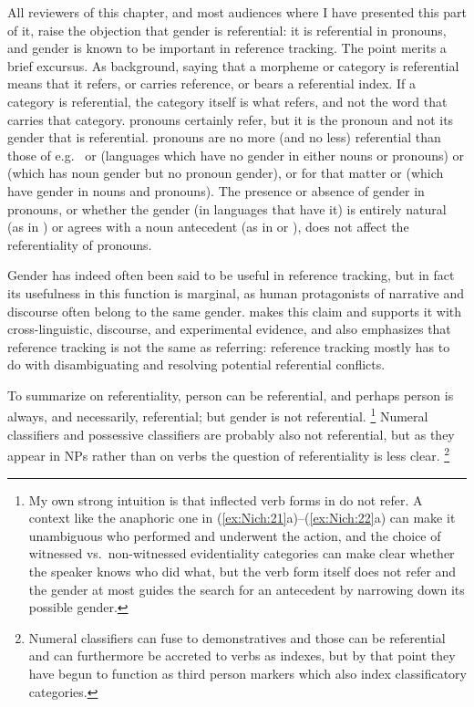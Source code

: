 \documentclass[output=collectionpaper]{langsci/langscibook}
\begin{document}
All reviewers of this chapter, and most audiences where I have presented this part of it, raise the objection that gender is referential: it is referential in  pronouns, and gender is known to be important in reference tracking. The point merits a brief excursus. As background, saying that a morpheme or category is referential means that it refers, or carries reference, or bears a referential index. If a category is referential, the category itself is what refers, and not the word that carries that category.  pronouns certainly refer, but it is the pronoun and not its gender that is referential.  pronouns are no more (and no less) referential than those of e.g.\  or  (languages which have no gender in either nouns or pronouns) or  (which has noun gender but no pronoun gender), or for that matter  or  (which have gender in nouns and pronouns). The presence or absence of gender in pronouns, or whether the gender (in languages that have it) is entirely natural (as in ) or agrees with a noun antecedent (as in  or ), does not affect the referentiality of pronouns.

Gender has indeed often been said to be useful in reference tracking, but in fact its usefulness in this function is marginal, as human protagonists of narrative and discourse often belong to the same gender. \citet[334--360]{Kibrik2011} makes this claim and supports it with cross-linguistic, discourse, and experimental evidence, and also emphasizes that reference tracking is not the same as referring: reference tracking mostly has to do with disambiguating and resolving potential referential conflicts.

To summarize on referentiality, person can be referential, and perhaps person is always, and necessarily, referential; but gender is not referential.%
\footnote{%
My own strong intuition is that inflected verb forms in  do not refer. A context like the anaphoric one in (\ref{ex:Nich:21}a)--(\ref{ex:Nich:22}a) can make it unambiguous who performed and underwent the action, and the choice of witnessed vs.\ non-witnessed evidentiality categories can make clear whether the speaker knows who did what, but the verb form itself does not refer and the gender at most guides the search for an antecedent by narrowing down its possible gender.
} %
Numeral classifiers and possessive classifiers are probably also not referential, but as they appear in NPs rather than on verbs the question of referentiality is less clear.%
\footnote{%
Numeral classifiers can fuse to demonstratives and those can be referential and can furthermore be accreted to verbs as indexes, but by that point they have begun to function as third person markers which also index classificatory categories.
}%
\end{document}
